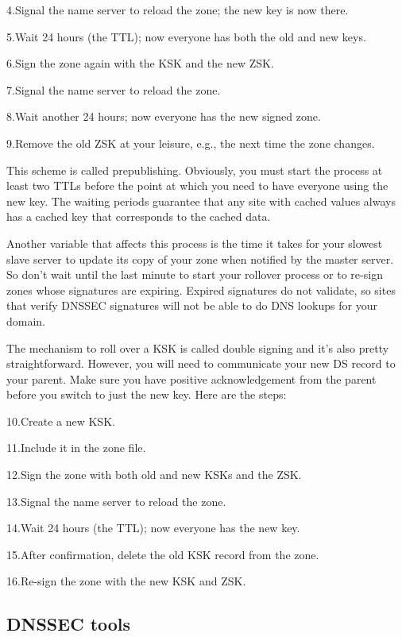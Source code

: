 {4.}Signal the name server to reload the zone; the new key is now there.

{5.}Wait 24 hours (the TTL); now everyone has both the old and new keys.

{6.}Sign the zone again with the KSK and the {new} ZSK.

{7.}Signal the name server to reload the zone.

{8.}Wait another 24 hours; now everyone has the new signed zone.

{9.}Remove the old ZSK at your leisure, e.g., the next time the zone
changes.

This scheme is called prepublishing. Obviously, you must start the
process at least two TTLs before the point at which you need to have
everyone using the new key. The waiting periods guarantee that any site
with cached values always has a cached key that corresponds to the
cached data.

Another variable that affects this process is the time it takes for your
slowest slave server to update its copy of your zone when notified by
the master server. So don't wait until the last minute to start your
rollover process or to re-sign zones whose signatures are expiring.
Expired signatures do not validate, so sites that verify DNSSEC
signatures will not be able to do DNS lookups for your domain.

The mechanism to roll over a KSK is called double signing and it's also
pretty straightforward. However, you will need to communicate your new
DS record to your parent. Make sure you have positive acknowledgement
from the parent before you switch to just the new key. Here are the
steps:

{10.}Create a new KSK.

{11.}Include it in the zone file.

{12.}Sign the zone with both old and new KSKs and the ZSK.

{13.}Signal the name server to reload the zone.

{14.}Wait 24 hours (the TTL); now everyone has the new key.

{15.}After confirmation, delete the old KSK record from the zone.

{16.}Re-sign the zone with the new KSK and ZSK.

\protect\hypertarget{part0024_split_067.html}{}{}

\hypertarget{part0024_split_067.htmlux5cux23_idContainer1069}{}
\hypertarget{part0024_split_067.htmlux5cux23calibre_pb_66}{%
\subsection[DNSSEC
tools]{\texorpdfstring{\protect\hypertarget{part0024_split_067.htmlux5cux23_idTextAnchor948}{}{}DNSSEC
tools}{DNSSEC tools}}\label{part0024_split_067.htmlux5cux23calibre_pb_66}}

